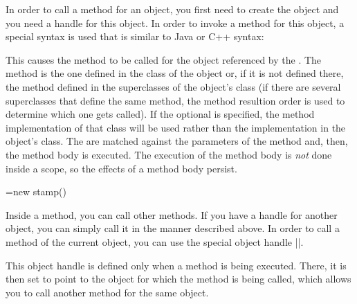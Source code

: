 In order to call a method for an object, you first need to create the
object and you need a handle for this object. In order to invoke a
method for this object, a special syntax is used that is similar to
Java or C++ syntax:

\begin{pgfmanualentry}
  \pgfmanualbody
  This causes the method  to be called for the
  object referenced by the . The method is the one
  defined in the class of the object or, if it is not defined there,
  the method defined in the superclasses of the object's class (if
  there are several superclasses that define the same method, the
  method resultion order is used to determine which one gets
  called). If the optional  is specified, the method
  implementation of that class will be used rather than the
  implementation in the object's class. The  
  are matched against the parameters of the method and, then, the
  method body is executed. The execution of the method body is
  \emph{not} done inside a scope, so the effects of a method body
  persist.

\begin{codeexample}

\pgfoonew \mystamp=new stamp()

\end{codeexample}

  Inside a method, you can call other methods. If you have a handle
  for another object, you can simply call it in the manner described
  above. In order to call a method of the current object, you can use
  the special object handle |\pgfoothis|.

  \begin{command}{\pgfoothis}
    This object handle is defined only when a method is being
    executed. There, it is then set to point to the object for which
    the method is being called, which allows you to call another
    method for the same object.


\end{command}
\end{pgfmanualentry}
